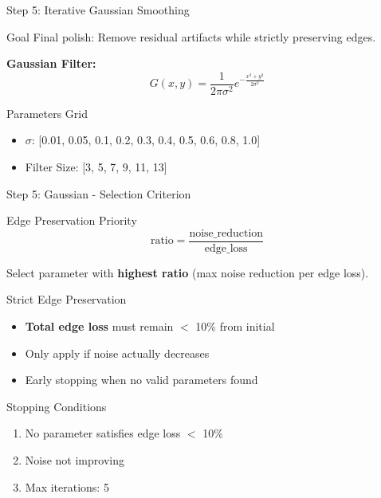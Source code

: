 \documentclass[aspectratio=169]{beamer}
\begin{document}
\begin{frame}{Step 5: Iterative Gaussian Smoothing}
    \begin{block}{Goal}
        Final polish: Remove residual artifacts while strictly preserving edges.
    \end{block}
    
    \textbf{Gaussian Filter:}
    \begin{equation}
        G(x,y) = \frac{1}{2\pi\sigma^2} e^{-\frac{x^2 + y^2}{2\sigma^2}}
    \end{equation}
    
    \begin{block}{Parameters Grid}
        \begin{itemize}
            \item $\sigma$: [0.01, 0.05, 0.1, 0.2, 0.3, 0.4, 0.5, 0.6, 0.8, 1.0]
            \item Filter Size: [3, 5, 7, 9, 11, 13]
        \end{itemize}
    \end{block}
\end{frame}

\begin{frame}{Step 5: Gaussian - Selection Criterion}
    \begin{block}{Edge Preservation Priority}
        \begin{equation}
            \text{ratio} = \frac{\text{noise\_reduction}}{\text{edge\_loss}}
        \end{equation}
        
        Select parameter with \textbf{highest ratio} (max noise reduction per edge loss).
    \end{block}
    
    \begin{alertblock}{Strict Edge Preservation}
        \begin{itemize}
            \item \textbf{Total edge loss} must remain $<$ 10\% from initial
            \item Only apply if noise actually decreases
            \item Early stopping when no valid parameters found
        \end{itemize}
    \end{alertblock}
    
    \begin{block}{Stopping Conditions}
        \begin{enumerate}
            \item No parameter satisfies edge loss $<$ 10\%
            \item Noise not improving
            \item Max iterations: 5
        \end{enumerate}
    \end{block}
\end{frame}
\end{document}
